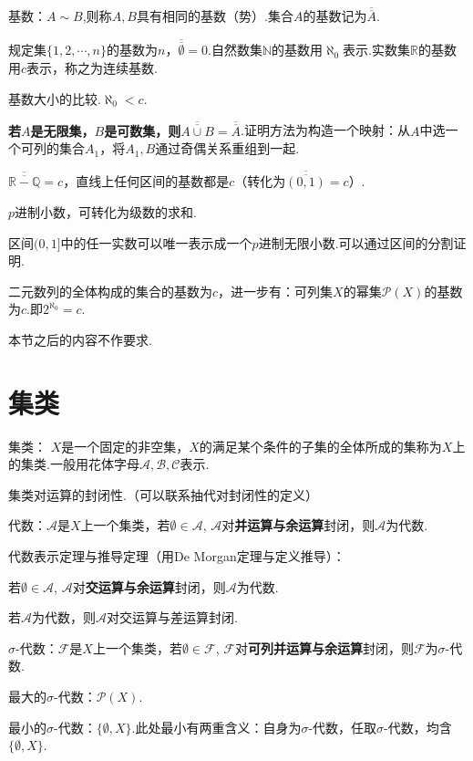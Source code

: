 \documentclass[bwprint, withoutpreface]{cumcmthesis}
\begin{document}
基数：$A \sim B$,则称$A, B$具有相同的基数（势）.集合$A$的基数记为$\overline{\overline{A}}$.

规定集$\{1, 2, \cdots, n\}$的基数为$n$，$\overline{\overline{\emptyset}}=0$.自然数集$\mathbb{N}$的基数用$\aleph_0$表示.实数集$\mathbb{R}$的基数用$c$表示，称之为连续基数.

基数大小的比较.$\aleph_0 < c$.

\textbf{若$A$是无限集，$B$是可数集，则$\overline{\overline{A \cup B}} = \overline{\overline{A}}$}.证明方法为构造一个映射：从$A$中选一个可列的集合$A_1$，将$A_1,B$通过奇偶关系重组到一起.

$\overline{\overline{\mathbb{R}-\mathbb{Q}}} = c$，直线上任何区间的基数都是$c$（转化为$\overline{\overline{(0, 1)}} = c$）.

$p$进制小数，可转化为级数的求和.

区间$(0, 1]$中的任一实数可以唯一表示成一个$p$进制无限小数.可以通过区间的分割证明.

二元数列的全体构成的集合的基数为$c$，进一步有：可列集$X$的幂集$\mathcal{P}(X)$的基数为$c$.即$2^{\aleph_0} = c$.

本节之后的内容不作要求.

\section{集类}
\indent 集类： $X$是一个固定的非空集，$X$的满足某个条件的子集的全体所成的集称为$X$上的集类.一般用花体字母$\mathcal{A},\mathcal{B},\mathcal{C}$表示.

集类对运算的封闭性.（可以联系抽代对封闭性的定义）

代数：$\mathcal{A}$是$X$上一个集类，若$\emptyset \in \mathcal{A}$, $\mathcal{A}$对\textbf{并运算与余运算}封闭，则$\mathcal{A}$为代数.

代数表示定理与推导定理（用De Morgan定理与定义推导）：

\indent \indent 若$\emptyset \in \mathcal{A}$, $\mathcal{A}$对\textbf{交运算与余运算}封闭，则$\mathcal{A}$为代数.

\indent \indent 若$\mathcal{A}$为代数，则$\mathcal{A}$对{交运算与差运算}封闭.

$\sigma$-代数：$\mathcal{F}$是$X$上一个集类，若$\emptyset \in \mathcal{F}$, $\mathcal{F}$对\textbf{可列并运算与余运算}封闭，则$\mathcal{F}$为$\sigma$-代数.

最大的$\sigma$-代数：$\mathcal{P}(X)$.

最小的$\sigma$-代数：$\{\emptyset, X\}$.此处最小有两重含义：自身为$\sigma$-代数，任取$\sigma$-代数，均含$\{\emptyset, X\}$.
\end{document}
